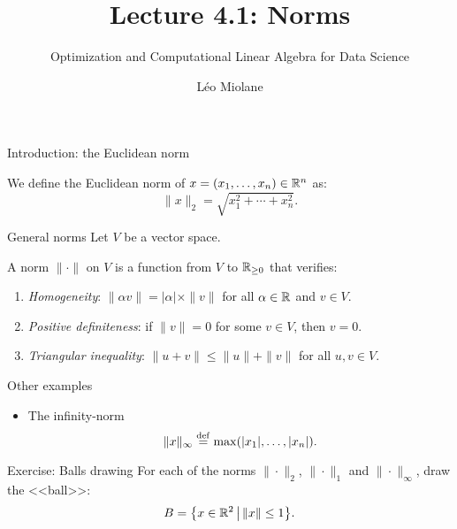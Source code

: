 \documentclass{beamer}
\title{Lecture 4.1: Norms}
\subtitle{Optimization and Computational Linear Algebra for Data Science}
\author{Léo Miolane}
\date{}
\begin{document}
\setcounter{showProgressBar}{0}
\setcounter{showSlideNumbers}{0}

\frame{\titlepage}

\setcounter{framenumber}{0}
\setcounter{showSlideNumbers}{1}

\begin{frame}[t]{Introduction: the Euclidean norm}
	\vspace{-0.4cm}
	\begin{definition}
		We define the Euclidean norm of $x=(x_1, \dots, x_n) \in \mathbb{R}^n$ as:
		$$
		\| x\|_2 = \sqrt{x_1^2 + \cdots + x_n^2}.
		$$
	\end{definition}
	\pause


\end{frame}

\begin{frame}[t]{General norms}
	Let $V$ be a vector space.
	\begin{definition}
		A norm $\| \cdot \|$ on $V$ is a function from $V$ to $\mathbb{R}_{\geq 0}$ that verifies:
		\vspace{0.1cm}
		\begin{enumerate}
			\item \emph{Homogeneity}: $\| \alpha v \| = |\alpha|\times \| v\|$ for all $\alpha \in \mathbb{R}$ and  $v \in V$.
				\vspace{0.1cm}
			\item \emph{Positive definiteness}: if $\|v\| = 0$ for some $v \in V$, then $v=0$.
				\vspace{0.1cm}
			\item \emph{Triangular inequality}: $\|u + v\| \leq \|u\| + \|v\|$ for all $u,v \in V$.
		\end{enumerate}
	\end{definition}
\end{frame}


\begin{frame}[t]{Other examples}
	\begin{itemize}
		\item The infinity-norm 
			$$\|x \|_{\infty}  \max(|x_1|, \dots, |x_n|).$$
	\end{itemize}
\end{frame}
\begin{frame}[t]{Exercise: Balls drawing}
	\vspace{-0.2cm}
	For each of the norms $\| \cdot \|_2$, $\| \cdot \|_1$ and $\| \cdot \|_{\infty}$, draw the <<ball>>:
	$$
	B = \big\{ x \in \mathbb{R}^2 \, \big| \, \|x\| \leq 1 \big\}.
	$$
	\pause
	\pause
\end{frame}
\end{document}
